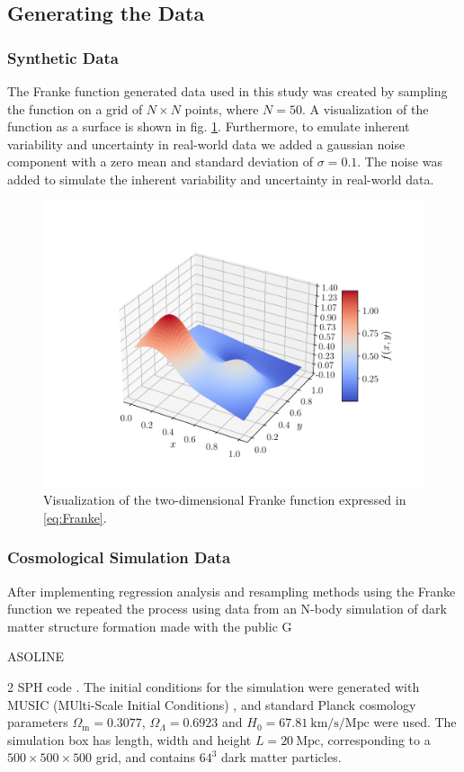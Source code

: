 \documentclass[aps,pra,english,notitlepage,reprint,nofootinbib]{revtex4-1}  %
\begin{document}
\subsection{Generating the Data}
\subsubsection{Synthetic Data}
The Franke function generated data used in this study was created by sampling the function on a grid of $N\times N$ points, where $N=50$. A visualization of the function as a surface is shown in fig. \ref{fig:Franke}. Furthermore, to emulate inherent variability and uncertainty in real-world data we added a gaussian noise component with a zero mean and standard deviation of $\sigma = 0.1$. The noise was added to simulate the inherent variability and uncertainty in real-world data.

\begin{figure}
  \vspace*{-5pt}
  \centering %
  \includegraphics[trim=2.8cm 1.4cm 1.0cm 2cm,clip,width=\columnwidth,keepaspectratio]{../figs/a_Franke_surf.pdf}
  \caption{Visualization of the two-dimensional Franke function expressed in \eqref{eq:Franke}.}\label{fig:Franke}
  \vspace*{-5pt}
\end{figure}

\subsubsection{Cosmological Simulation Data}
After implementing regression analysis and resampling methods using the Franke function we repeated the process using data from an N-body simulation of dark matter structure formation made with the public G\begin{footnotesize}ASOLINE\end{footnotesize}2 SPH code \cite{gasoline}. The initial conditions for the simulation were generated with MUSIC (MUlti-Scale Initial Conditions) \cite{music}, and standard Planck cosmology parameters $\Omega_\text{m}=0.3077$, $\Omega_{\Lambda}=0.6923$ and $H_0=67.81\:\text{km/s/Mpc}$ were used. The simulation box has length, width and height $L=20\:\text{Mpc}$, corresponding to a $500\times500\times500$ grid, and contains $64^3$ dark matter particles. 
\end{document}
